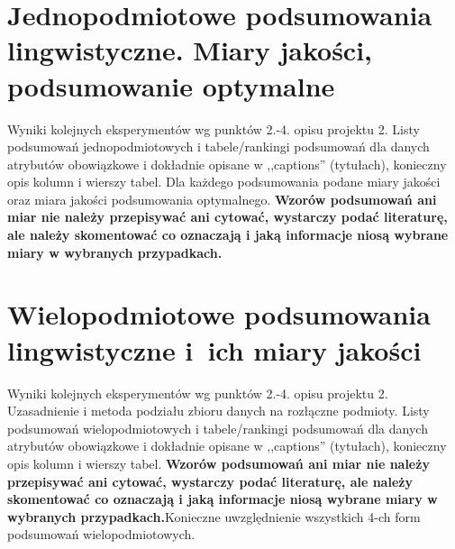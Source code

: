 \documentclass{classrep}
\begin{document}




\section{ Jednopodmiotowe podsumowania lingwistyczne. Miary jakości, podsumowanie optymalne}
Wyniki kolejnych eksperymentów wg punktów 2.-4. opisu projektu 2.  Listy podsumowań
jednopodmiotowych i tabele/rankingi podsumowań dla danych atrybutów obowiązkowe i dokładnie opisane w ,,captions'' (tytułach), konieczny opis kolumn i wierszy tabel. Dla każdego podsumowania podane miary jakości oraz miara jakości podsumowania
optymalnego. {\bf Wzorów podsumowań ani miar nie należy przepisywać ani cytować, wystarczy podać literaturę, ale
należy skomentować co oznaczają i jaką informacje niosą wybrane miary w wybranych
przypadkach.}\\

\section{Wielopodmiotowe podsumowania lingwistyczne i~ich miary jakości} 
Wyniki kolejnych eksperymentów wg punktów 2.-4. opisu projektu 2. Uzasadnienie i
metoda podziału zbioru danych na rozłączne podmioty. Listy podsumowań
wielopodmiotowych i tabele/rankingi podsumowań dla danych atrybutów obowiązkowe i
dokładnie opisane w ,,captions'' (tytułach), konieczny opis kolumn i wierszy tabel.
{\bf Wzorów podsumowań ani miar nie należy przepisywać ani cytować, wystarczy podać literaturę, ale
należy skomentować co oznaczają i jaką informacje niosą wybrane miary w wybranych
przypadkach.}Konieczne uwzględnienie wszystkich 4-ch form podsumowań wielopodmiotowych. 
\\ 
\end{document}
